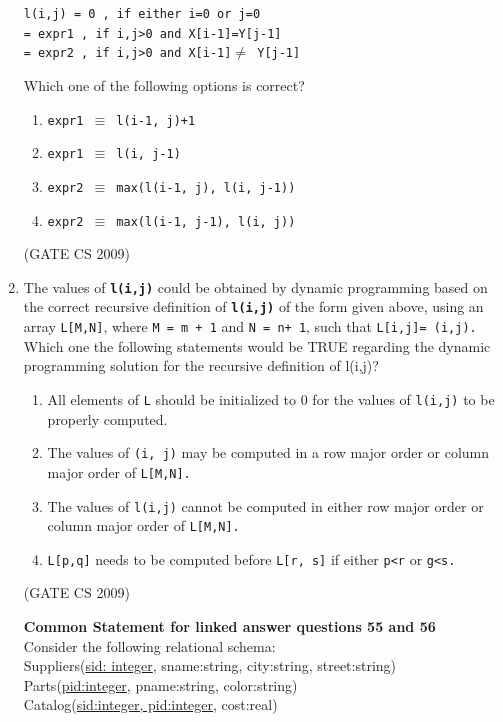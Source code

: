 \documentclass[a4paper, 11pt]{article}
\begin{document}
\begin{enumerate}
        \texttt{l(i,j) = 0 , if either i=0 or j=0\\
        = expr1 , if i,j>0 and X[i-1]=Y[j-1]\\
        = expr2 , if i,j>0 and X[i-1]$\neq$ Y[j-1]}

    Which one of the following options is correct?
    \begin{enumerate}[label=(\Alph*)]
        \item  \texttt{expr1 $\equiv$ l(i-1, j)+1}
        \item  \texttt{expr1 $\equiv$ l(i, j-1)}
        \item  \texttt{expr2 $\equiv$ max(l(i-1, j), l(i, j-1))}
        \item  \texttt{expr2 $\equiv$ max(l(i-1, j-1), l(i, j))}

    \end{enumerate}

    \hfill (GATE CS 2009)

    \item The values of \texttt{\textbf{l(i,j)}} could be obtained by dynamic programming based on the correct recursive definition of \texttt{\textbf{l(i,j)}} of the form given above, using an array \texttt{L[M,N]}, where \texttt{M = m + 1} and \texttt{N = n+ 1}, such that \texttt{L[i,j]= (i,j).}\\
    Which one the following statements would be TRUE regarding the dynamic programming solution for the recursive definition of l(i,j)?

    \begin{enumerate}[label=(\Alph*)]
        \item All elements of \texttt{L} should be initialized to 0 for the values of \texttt{l(i,j)} to be properly computed. 
        \item The values of \texttt{(i, j)} may be computed in a row major order or column major order of \texttt{L[M,N].}
        \item The values of \texttt{l(i,j)} cannot be computed in either row major order or column major order of \texttt{L[M,N].}
        \item \texttt{L[p,q]} needs to be computed before \texttt{L[r, s]} if either \texttt{p<r} or \texttt{g<s.}
    \end{enumerate}

    \hfill (GATE CS 2009)

{\Large \textbf{Common Statement for linked answer questions 55 and 56}} \\
    Consider the following relational schema:\\
    \hspace*{1cm} Suppliers(\underline{sid: integer}, sname:string, city:string, street:string)\\
    \hspace*{1cm} Parts(\underline{pid:integer}, pname:string, color:string)\\
    \hspace*{1cm} Catalog(\underline{sid:integer, pid:integer}, cost:real)\\
    

\end{enumerate}
\end{document}
